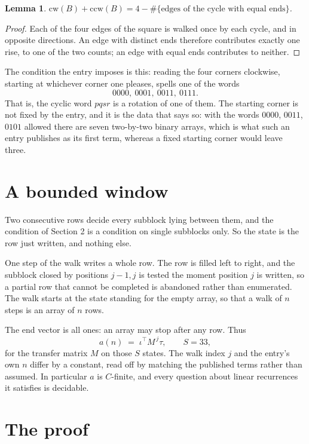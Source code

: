 \documentclass[11pt,a4paper]{article}
\theoremstyle{plain}
\newtheorem{lemma}[theorem]{Lemma}
\theoremstyle{definition}
\begin{document}
\begin{lemma}\label{lem:sum}
$\mathrm{cw}(B)+\mathrm{ccw}(B)=4-\#\{\text{edges of the cycle with equal ends}\}$.
\end{lemma}

\begin{proof}
Each of the four edges of the square is walked once by each cycle, and in opposite directions.
An edge with distinct ends therefore contributes exactly one rise, to one of the two counts;
an edge with equal ends contributes to neither.
\end{proof}

The condition the entry imposes is this: reading the four corners clockwise, starting at whichever corner one pleases, spells one of the words
\[
0000,\ 0001,\ 0011,\ 0111.
\]
That is, the cyclic word $pqsr$ is a rotation of one of them. The starting corner is not fixed by the entry, and it is the data that says so: with the words $0000$, $0011$, $0101$ allowed there are seven two-by-two binary arrays, which is what such an entry publishes as its first term, whereas a fixed starting corner would leave three.

\section{A bounded window}

Two consecutive rows decide every subblock lying between them, and the condition of Section 2 is a condition on single subblocks only. So the state is the row just written, and nothing else.

One step of the walk writes a whole row. The row is filled left to right, and the subblock
closed by positions $j-1,j$ is tested the moment position $j$ is written, so a partial row that
cannot be completed is abandoned rather than enumerated. The walk starts at the state standing
for the empty array, so that a walk of $n$ steps is an array of $n$ rows.

The end vector is all ones: an array may stop after any row. Thus
\[
a(n)\;=\;\iota^{\!\top}M^{\,j}\tau ,\qquad S=33,
\]
for the transfer matrix $M$ on those $S$ states. The walk index $j$ and the entry's own $n$
differ by a constant, read off by matching the published terms rather than assumed. In
particular $a$ is $C$-finite, and every question about linear recurrences it satisfies is
decidable.

\section{The proof}
\end{document}
